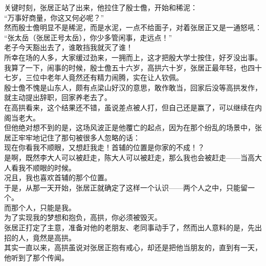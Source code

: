 \begin{multicols}{\theparacolNo}
关键时刻，张居正站了出来，他拉住了殷士儋，开始和稀泥：\\

“万事好商量，你这又何必呢？”\\

然而殷士儋明显不是稀泥，而是水泥，一点不给面子，对着张居正又是一通怒吼：\\

“张太岳（张居正号太岳），你少多管闲事，走远点！”\\

老子今天豁出去了，谁敢挡我就灭了谁！\\

所幸在场的人多，大家缓过劲来，一拥而上，这才把殷大学士按住，好歹没出事。\\

我算了一下，闹事的时候，殷士儋五十六岁，高拱六十岁，张居正最年轻，也四十七岁，三位中老年人竟然还有精力闹腾，实在让人钦佩。\\

殷士儋不愧是山东人，颇有点梁山好汉的意思，敢作敢当，回家后没等高拱发作，就主动提出辞职，回家养老去了。\\

在高拱看来，这个结果还不错，虽说差点被人打，但自己还是赢了，可以继续在内阁当老大。\\

但他绝对想不到的是，这场风波正是他覆亡的起点，因为在那个纷乱的场景中，张居正牢牢地记住了那句被很多人忽略的话：\\

现在你看我不顺眼，又想赶我走！首辅的位置是你家的不成！？\\

是啊，既然李大人可以被赶走，陈大人可以被赶走，那么我也会被赶走——当高大人看我不顺眼的时候。\\

况且，我也喜欢首辅的那个位置。\\

于是，从那一天开始，张居正就确定了这样一个认识——两个人之中，只能留一个。\\

而那个人，只能是我。\\

为了实现我的梦想和抱负，高拱，你必须被毁灭。\\

张居正打定了主意，准备对他的老朋友、老同事动手了，然而出人意料的是，先出招的人，竟然是高拱。\\

其实一直以来，高拱虽说对张居正抱有戒心，却还是把他当朋友的，直到有一天，他听到了那个传闻。\\


\end{multicols}
